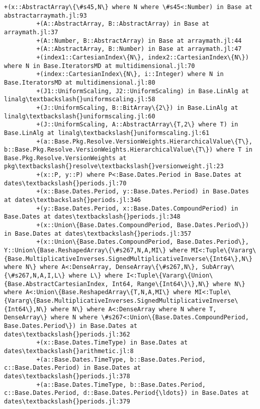 \documentclass[11pt]{article}
\begin{document}
\begin{Verbatim}[commandchars=\\\{\}]
         +(x::AbstractArray\{\#s45,N\} where N where \#s45<:Number) in Base at abstractarraymath.jl:93
         +(A::AbstractArray, B::AbstractArray) in Base at arraymath.jl:37
         +(A::Number, B::AbstractArray) in Base at arraymath.jl:44
         +(A::AbstractArray, B::Number) in Base at arraymath.jl:47
         +(index1::CartesianIndex\{N\}, index2::CartesianIndex\{N\}) where N in Base.IteratorsMD at multidimensional.jl:70
         +(index::CartesianIndex\{N\}, i::Integer) where N in Base.IteratorsMD at multidimensional.jl:80
         +(J1::UniformScaling, J2::UniformScaling) in Base.LinAlg at linalg\textbackslash{}uniformscaling.jl:58
         +(J::UniformScaling, B::BitArray\{2\}) in Base.LinAlg at linalg\textbackslash{}uniformscaling.jl:60
         +(J::UniformScaling, A::AbstractArray\{T,2\} where T) in Base.LinAlg at linalg\textbackslash{}uniformscaling.jl:61
         +(a::Base.Pkg.Resolve.VersionWeights.HierarchicalValue\{T\}, b::Base.Pkg.Resolve.VersionWeights.HierarchicalValue\{T\}) where T in Base.Pkg.Resolve.VersionWeights at pkg\textbackslash{}resolve\textbackslash{}versionweight.jl:23
         +(x::P, y::P) where P<:Base.Dates.Period in Base.Dates at dates\textbackslash{}periods.jl:70
         +(x::Base.Dates.Period, y::Base.Dates.Period) in Base.Dates at dates\textbackslash{}periods.jl:346
         +(y::Base.Dates.Period, x::Base.Dates.CompoundPeriod) in Base.Dates at dates\textbackslash{}periods.jl:348
         +(x::Union\{Base.Dates.CompoundPeriod, Base.Dates.Period\}) in Base.Dates at dates\textbackslash{}periods.jl:357
         +(x::Union\{Base.Dates.CompoundPeriod, Base.Dates.Period\}, Y::Union\{Base.ReshapedArray\{\#s267,N,A,MI\} where MI<:Tuple\{Vararg\{Base.MultiplicativeInverses.SignedMultiplicativeInverse\{Int64\},N\} where N\} where A<:DenseArray, DenseArray\{\#s267,N\}, SubArray\{\#s267,N,A,I,L\} where L\} where I<:Tuple\{Vararg\{Union\{Base.AbstractCartesianIndex, Int64, Range\{Int64\}\},N\} where N\} where A<:Union\{Base.ReshapedArray\{T,N,A,MI\} where MI<:Tuple\{Vararg\{Base.MultiplicativeInverses.SignedMultiplicativeInverse\{Int64\},N\} where N\} where A<:DenseArray where N where T, DenseArray\} where N where \#s267<:Union\{Base.Dates.CompoundPeriod, Base.Dates.Period\}) in Base.Dates at dates\textbackslash{}periods.jl:362
         +(x::Base.Dates.TimeType) in Base.Dates at dates\textbackslash{}arithmetic.jl:8
         +(a::Base.Dates.TimeType, b::Base.Dates.Period, c::Base.Dates.Period) in Base.Dates at dates\textbackslash{}periods.jl:378
         +(a::Base.Dates.TimeType, b::Base.Dates.Period, c::Base.Dates.Period, d::Base.Dates.Period{\ldots}) in Base.Dates at dates\textbackslash{}periods.jl:379

\end{Verbatim}
\end{document}
